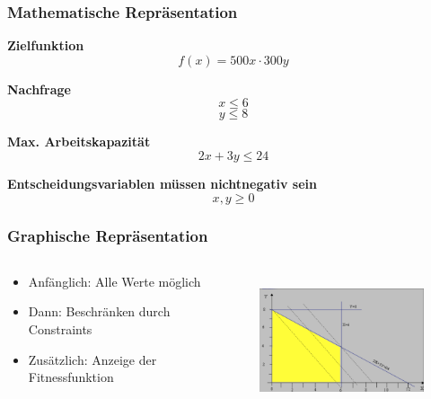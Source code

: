 \documentclass[handout]{beamer}
\begin{document}
  \begin{frame}
    \frametitle{Mathematische Repräsentation}

    \textbf{Zielfunktion}
    $$f(x) = 500x \cdot 300y $$
    \pause

    \textbf{Nachfrage}
    $$x \leq 6$$
    $$y \leq 8$$
    \pause

    \textbf{Max. Arbeitskapazität}
    $$2x + 3y \leq 24$$
    \pause

    \textbf{Entscheidungsvariablen müssen nichtnegativ sein}
    $$x, y \geq 0$$
  \end{frame}

  \begin{frame}
    \frametitle{Graphische Repräsentation}
    \begin{columns}[onlytextwidth]
      \begin{column}{0.4\textwidth}
        \begin{itemize}[<+->]
          \item Anfänglich: Alle Werte möglich
          \item Dann: Beschränken durch Constraints
          \item Zusätzlich: Anzeige der Fitnessfunktion
        \end{itemize}
      \end{column}
      \begin{column}{0.6\textwidth}
        \begin{figure}
          \centering
          \includegraphics[width=\linewidth,height=150px,keepaspectratio]{optimization_graphic.png}
        \end{figure}
      \end{column}
    \end{columns}
  \end{frame}
\end{document}
